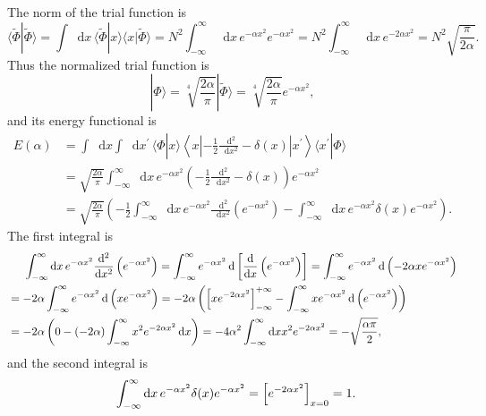 \documentclass[a4paper]{book}
\newcounter{solution}[chapter]
\newcommand*{\dif}{\mathop{}\!\mathrm{d}}
\begin{document}
	\begin{solution}

	The norm of the trial function is
	\[
		\langle \tilde{\Phi} | \tilde{\Phi} \rangle = \int \dif x \, \langle \tilde{\Phi} | x \rangle \langle x | \tilde{\Phi} \rangle = N^2 \int_{-\infty}^{\infty} \dif x \, e^{-\alpha x^2} e^{-\alpha x^2} = N^2 \int_{-\infty}^{\infty} \dif x \, e^{-2\alpha x^2} = N^2 \sqrt{ \frac{ \pi }{ 2\alpha } } .
	\]
	Thus the normalized trial function is
	\[
		| \Phi \rangle = \sqrt[4]{ \frac{ 2\alpha }{ \pi } } | \tilde{\Phi} \rangle = \sqrt[4]{ \frac{ 2\alpha }{ \pi } } e^{- \alpha x^2} ,
	\]
	and its energy functional is
	\begin{align*}
		E( \alpha ) &= \int \dif x \int \dif x^\prime \, \langle \Phi | x \rangle \left\langle x \left| -\frac 12 \frac{\dif^2}{\dif x^2}-\delta(x) \right| x^\prime \right\rangle \langle x^\prime | \Phi \rangle \\
		&= \sqrt{ \frac{ 2\alpha }{ \pi } } \int_{-\infty}^{\infty} \dif x \, e^{-\alpha x^2} \left( -\frac 12 \frac{\dif^2}{\dif x^2}-\delta(x) \right) e^{-\alpha x^2} \\
		&= \sqrt{ \frac{ 2\alpha }{ \pi } } \left( - \frac{1}{2} \int_{-\infty}^{\infty} \dif x \, e^{-\alpha x^2} \frac{\dif^2}{\dif x^2} \left( e^{-\alpha x^2} \right) - \int_{-\infty}^{\infty} \dif x \, e^{-\alpha x^2} \delta(x) e^{-\alpha x^2} \right) .
	\end{align*}
	The first integral is
	\begin{align*}
		&\hspace{1.4em}\int_{-\infty}^{\infty} \dif x \, e^{-\alpha x^2} \frac{\dif^2}{\dif x^2} \left( e^{-\alpha x^2} \right) = \int_{-\infty}^{\infty} e^{-\alpha x^2} \dif \left[ \frac{\dif}{\dif x}  \left( e^{-\alpha x^2} \right) \right] = \int_{-\infty}^{\infty} e^{-\alpha x^2} \dif \left( - 2\alpha x e^{-\alpha x^2} \right) \\
		&= - 2\alpha \int_{-\infty}^{\infty} e^{-\alpha x^2} \dif \left( x e^{-\alpha x^2} \right) = -2\alpha \left( \left[ x e^{-2\alpha x^2} \right]^{+\infty}_{-\infty} - \int_{-\infty}^{\infty} xe^{-\alpha x^2} \dif \left( e^{-\alpha x^2} \right) \right) \\
		&= - 2 \alpha \left( 0 - ( -2\alpha ) \int_{-\infty}^{\infty} x^2 e^{-2\alpha x^2} \dif x \right) = -4\alpha^2 \int_{-\infty}^{\infty} \dif x x^2 e^{-2\alpha x^2} = - \sqrt{ \frac{ \alpha \pi }{ 2 } } ,
	\end{align*}
	and the second integral is
	\begin{align*}
		&\hspace{1.4em} \int_{-\infty}^{\infty} \dif x \, e^{-\alpha x^2} \delta(x) e^{-\alpha x^2} = \left[ e^{-2\alpha x^2} \right]_{x=0} = 1 .

\end{align*}
\end{solution}
\end{document}
